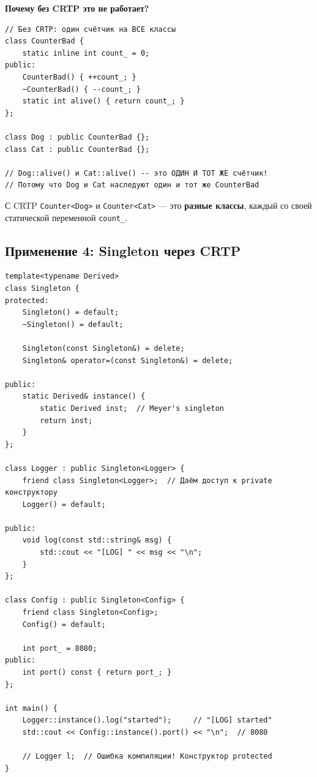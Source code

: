 \documentclass[a4paper,12pt]{article}
\begin{document}
\textbf{Почему без CRTP это не работает?}

\begin{lstlisting}
// Без CRTP: один счётчик на ВСЕ классы
class CounterBad {
    static inline int count_ = 0;
public:
    CounterBad() { ++count_; }
    ~CounterBad() { --count_; }
    static int alive() { return count_; }
};

class Dog : public CounterBad {};
class Cat : public CounterBad {};

// Dog::alive() и Cat::alive() -- это ОДИН И ТОТ ЖЕ счётчик!
// Потому что Dog и Cat наследуют один и тот же CounterBad
\end{lstlisting}

С CRTP \texttt{Counter<Dog>} и \texttt{Counter<Cat>} --- это \textbf{разные классы},
каждый со своей статической переменной \texttt{count\_}.

\subsection{Применение 4: Singleton через CRTP}

\begin{lstlisting}
template<typename Derived>
class Singleton {
protected:
    Singleton() = default;
    ~Singleton() = default;

    Singleton(const Singleton&) = delete;
    Singleton& operator=(const Singleton&) = delete;

public:
    static Derived& instance() {
        static Derived inst;  // Meyer's singleton
        return inst;
    }
};

class Logger : public Singleton<Logger> {
    friend class Singleton<Logger>;  // Даём доступ к private конструктору
    Logger() = default;

public:
    void log(const std::string& msg) {
        std::cout << "[LOG] " << msg << "\n";
    }
};

class Config : public Singleton<Config> {
    friend class Singleton<Config>;
    Config() = default;

    int port_ = 8080;
public:
    int port() const { return port_; }
};

int main() {
    Logger::instance().log("started");     // "[LOG] started"
    std::cout << Config::instance().port() << "\n";  // 8080

    // Logger l;  // Ошибка компиляции! Конструктор protected
}
\end{lstlisting}
\end{document}

